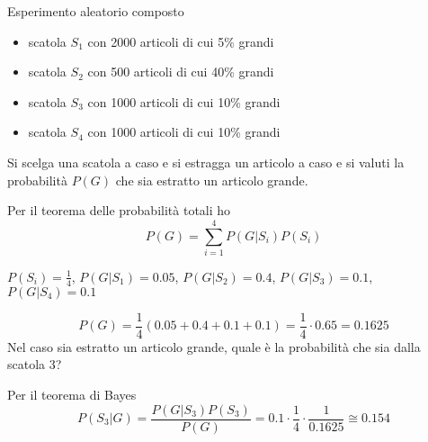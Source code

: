 \begin{esempio}
Esperimento aleatorio composto
\begin{itemize}
	\item scatola $S_1$ con 2000 articoli di cui 5\% grandi
	\item scatola $S_2$ con 500 articoli di cui 40\% grandi
	\item scatola $S_3$ con 1000 articoli di cui 10\% grandi
	\item scatola $S_4$ con 1000 articoli di cui 10\% grandi
\end{itemize}
Si scelga una scatola a caso e si estragga un articolo a caso e si valuti la probabilità $P(G)$ che sia estratto un articolo grande.

Per il teorema delle probabilità totali ho
\[
	P(G)=\sum_{i=1}^{4}P(G|S_i)P(S_i)
\]

$P(S_i)=\frac{1}{4}$, $P(G|S_1)=0.05$, $P(G|S_2)=0.4$, $P(G|S_3)=0.1$, $P(G|S_4)=0.1$

\[
	P(G)=\frac{1}{4}(0.05+0.4+0.1+0.1)=\frac{1}{4}\cdot 0.65=0.1625
\]
Nel caso sia estratto un articolo grande, quale è la probabilità che sia dalla scatola 3?

Per il teorema di Bayes
\[P(S_3|G)=\frac{P(G|S_3)P(S_3)}{P(G)}=0.1\cdot\frac{1}{4}\cdot\frac{1}{0.1625}\cong 0.154\]
\end{esempio}


